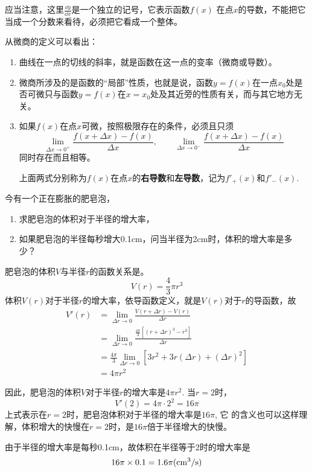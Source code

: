 应当注意，这里$\frac{\dd y}{\dd x}$是一个独立的记号，它表示函数$f(x)$
在点$x$的导数，不能把它当成一个分数来看待，必须把它看成一个整体。

从微商的定义可以看出：
\begin{enumerate}
\item 曲线在一点的切线的斜率，就是函数在这一点的变率（微商或导数）。    
\item 微商所涉及的是函数的“局部”性质，也就是说，函数$y=f(x)$在一点$x_0$处是否可微只与函数$y=f(x)$在$x=x_0$处及其近旁的性质有关，而与其它地方无关。    
\item 如果$f(x)$在点$x$可微，按照极限存在的条件，必须且只须
\[\lim_{\Delta x\to 0^+}\frac{f (x+\Delta x) -f (x)}{\Delta x},\qquad \lim_{\Delta x\to 0^-}\frac{f (x+\Delta x) -f (x)}{\Delta x}\]
同时存在而且相等。

上面两式分别称为$f(x)$在点$x$的\textbf{右导数}和\textbf{左导数}，记为$f'_+(x)$和$f'_-(x)$.
\end{enumerate}

\begin{example}
今有一个正在膨胀的肥皂泡，
\begin{enumerate}
\item 求肥皂泡的体积对于半径的增大率，
\item 如果肥皂泡的半径每秒增大0.1cm，问当半径为2cm时，体积的增大率是多少？
\end{enumerate}
\end{example}

\begin{solution}
    肥皂泡的体积$V$与半径$r$的函数关系是。
\[ V(r) =\frac{4}{3}\pi r^3\]
体积$V(r)$对于半径$r$的增大率，依导函数定义，就是$V(r)$对于$r$的导函数，故
\[\begin{split}
    V'(r)&=\lim_{\Delta r\to 0}\frac{V(r+\Delta r)-V(r)}{\Delta r}\\
    &=\lim_{\Delta r\to 0}\frac{\frac{4\pi }{3}[(r+\Delta r)^3-r^3]}{\Delta r}\\
    &=\frac{4\pi }{3}\lim_{\Delta r\to 0}[3r^2+3r(\Delta r)+(\Delta r)^2]\\
    &=4\pi r^2
\end{split}\]

因此，肥皂泡的体积$V$对于半径$r$的增大率是$4\pi r^2$. 当$r=2$时，\[V'(2)=4\pi \cdot 2^2=16\pi \]
上式表示在$r=2$时，肥皂泡体积对于半径的增大率是$16\pi$, 它
的含义也可以这样理解，体积增大的快慢在$r=2$时，是$16\pi$倍于半径增大的快慢。

由于半径的增大率是每秒0.1cm，故体积在半径等于2时的增大率是
\[16\pi \times0.1=1.6\pi ({\rm cm^3/s})\]
\end{solution}

